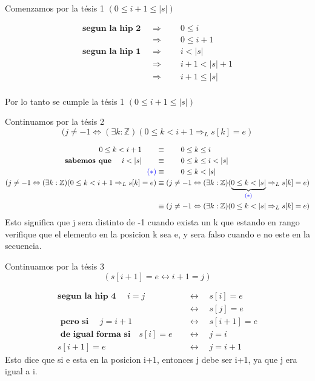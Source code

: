 \documentclass[12pt]{book}
\begin{document}
\begin{shaded}
Comenzamos por la t\'esis 1 $ ( 0\leq i +1 \leq|s|) $
\end{shaded}
\begin{align*}
\textbf{segun la hip 2 } &\Rightarrow \qquad 0 \leq i \\ 
&\Rightarrow \qquad 0 \leq i+1 \\
\textbf{segun la hip 1 } &\Rightarrow \qquad i < |s| \\ 
&\Rightarrow \qquad i+1 < |s|+1 \\
&\Rightarrow \qquad i +1 \leq |s| \\
\end{align*}
\begin{shaded}
Por lo tanto se cumple la t\'esis 1 $ ( 0\leq i +1 \leq|s|) $
\end{shaded}
\begin{shaded}
Continuamos por la t\'esis 2 \\
\[ (j\neq -1 \Leftrightarrow (\exists k: \mathbb{Z}) ( 0 \leq k < i + 1 \Rightarrow_L s[k] = e) \]
\end{shaded}
\begin{align*}
 0 \leq k < i + 1 \qquad  &\equiv \qquad  0 \leq k \leq i \\
\textbf{sabemos que } \quad i  < |s| \qquad  &\equiv \qquad  0 \leq k \leq i < |s|\\
\textcolor{blue}{(*)} &\equiv \qquad   0 \leq k  < |s|\\
(j\neq -1 \Leftrightarrow (\exists k: \mathbb{Z}) ( 0 \leq k < i + 1 \Rightarrow_L s[k] = e) & \equiv  (j\neq -1 \Leftrightarrow (\exists k: \mathbb{Z}) ( \underbrace{ 0 \leq k < |s|}_{\textcolor{blue}{(*)}} \Rightarrow_L s[k] = e) \\
& \equiv  (j\neq -1 \Leftrightarrow (\exists k: \mathbb{Z}) (  0 \leq k < |s| \Rightarrow_L s[k] = e)
\end{align*}
Esto significa que j sera distinto de -1 cuando exista un k que estando en rango verifique que el elemento en la posicion k sea e, y sera falso cuando e no este en la secuencia.

\begin{shaded}
Continuamos por la t\'esis 3 \[ (s[i+1] = e \leftrightarrow i+1 = j) \]
\end{shaded}
\begin{align*}
\textbf{segun la hip 4 } \quad i = j \quad   &\leftrightarrow \quad s[i] = e \\ 
&\leftrightarrow \quad  s[j] = e \\
\textbf{ pero si } \quad  j =i+1 \quad   &\leftrightarrow \quad  s[i+1] = e \\
\textbf{ de igual forma si} \quad  s[i] = e  \quad   &\leftrightarrow \quad j=i \\
s[i+1] = e  \quad   &\leftrightarrow \quad j=i+1 
\end{align*}
Esto dice que si e esta en la posicion i+1, entonces j debe ser i+1, ya que j era igual a i.
\end{document}
